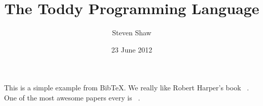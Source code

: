 \documentclass[11pt]{article}
\begin{document}
\title{The Toddy Programming Language}
\author{Steven Shaw}
\date{23 June 2012}
\maketitle

This is a simple example from Bib\TeX. We really like Robert Harper's book ~\cite{Harper2010}.
One of the most awesome papers every is ~\cite{Dreyer2007}.

{}

\end{document}
